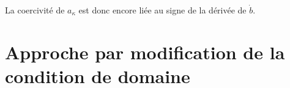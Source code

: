 \documentclass[a4paper]{article}
\begin{document}
La coercivité de $a_\kappa$ est donc encore liée au signe de la dérivée de $\dot{b}$.

\newpage

\section{Approche par modification de la condition de domaine}


\newpage

\medskip


	
\end{document}
